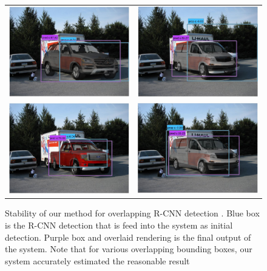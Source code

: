 \documentclass[10pt,twocolumn,letterpaper]{article}
\begin{document}
\begin{figure}[h]
\setlength\tabcolsep{5pt}
\begin{tabular}{cc}
  \includegraphics[width=0.45\linewidth]{car_pascal/1.png} &   
  \includegraphics[width=0.45\linewidth]{car_pascal/2.png} \\   
  \includegraphics[width=0.45\linewidth]{car_pascal/3.png} &   
  \includegraphics[width=0.45\linewidth]{car_pascal/4.png} \\   
\end{tabular}
\caption{Stability of our method for overlapping R-CNN detection \cite{Girshick14}. Blue box is the R-CNN detection that is feed into the system as initial detection. Purple box and overlaid rendering is the final output of the system. Note that for various overlapping bounding boxes, our system accurately estimated the reasonable result}
  \label{fig:stability}
\end{figure}
\end{document}
